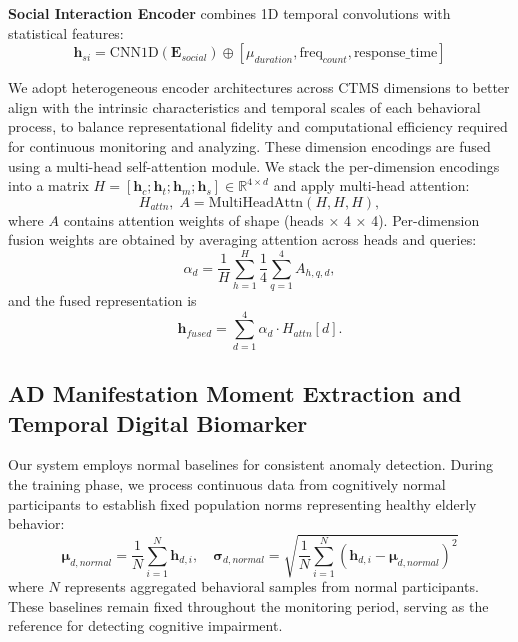 \documentclass[sigconf, anonymous, 9pt, nonacm]{acmart}
\begin{document}
\noindent\textbf{Social Interaction Encoder} combines 1D temporal convolutions with statistical features:
\begin{equation*}
\mathbf{h}_{si} = \text{CNN1D}(\mathbf{E}_{social}) \oplus [\mu_{duration}, \text{freq}_{count}, \text{response\_time}]
\end{equation*}

We adopt heterogeneous encoder architectures across CTMS dimensions to better align with the intrinsic characteristics and temporal scales of each behavioral process, to balance representational fidelity and computational efficiency required for continuous monitoring and analyzing.
These dimension encodings are fused using a multi-head self-attention module. We stack the per-dimension encodings into a matrix
\(H=[\mathbf{h}_c;\mathbf{h}_t;\mathbf{h}_m;\mathbf{h}_s]\in\mathbb{R}^{4\times d}\) and apply multi-head attention:
\begin{equation*}
H_{attn},\;A = \text{MultiHeadAttn}(H,H,H),
\end{equation*}
where $A$ contains attention weights of shape (heads × 4 × 4). Per-dimension fusion weights are obtained by averaging attention across heads and queries:
\begin{equation*}
\alpha_d = \frac{1}{H}\sum_{h=1}^{H}\frac{1}{4}\sum_{q=1}^{4} A_{h,q,d},
\end{equation*}
and the fused representation is
\begin{equation*}
\mathbf{h}_{fused} = \sum_{d=1}^{4} \alpha_d \cdot H_{attn}[d].
\end{equation*}



\subsection{AD Manifestation Moment Extraction and Temporal Digital Biomarker}

Our system employs normal baselines for consistent anomaly detection. During the training phase, we process continuous data from cognitively normal participants to establish fixed population norms representing healthy elderly behavior:
\begin{equation*}
\boldsymbol{\mu}_{d,normal} = \frac{1}{N}\sum_{i=1}^{N}\mathbf{h}_{d,i}, \quad \boldsymbol{\sigma}_{d,normal} = \sqrt{\frac{1}{N}\sum_{i=1}^{N}(\mathbf{h}_{d,i} - \boldsymbol{\mu}_{d,normal})^2}
\end{equation*}
where $N$ represents aggregated behavioral samples from normal participants. These baselines remain fixed throughout the monitoring period, serving as the reference for detecting cognitive impairment.
\end{document}
